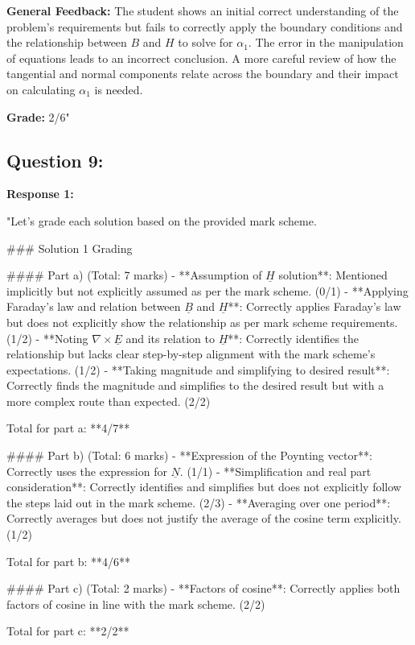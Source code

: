 \documentclass[a4paper,11pt]{article}
\begin{document}
\textbf{General Feedback:}
The student shows an initial correct understanding of the problem's requirements but fails to correctly apply the boundary conditions and the relationship between \(B\) and \(H\) to solve for \(\alpha_1\). The error in the manipulation of equations leads to an incorrect conclusion. A more careful review of how the tangential and normal components relate across the boundary and their impact on calculating \(\alpha_1\) is needed.

\textbf{Grade:} 2/6"

\subsection*{Question 9:}

\textbf{Response 1:}

"Let's grade each solution based on the provided mark scheme.

### Solution 1 Grading

#### Part a) (Total: 7 marks)
- **Assumption of \(\underline{H}\) solution**: Mentioned implicitly but not explicitly assumed as per the mark scheme. (0/1)
- **Applying Faraday's law and relation between \(\underline{B}\) and \(\underline{H}\)**: Correctly applies Faraday's law but does not explicitly show the relationship as per mark scheme requirements. (1/2)
- **Noting \(\nabla \times \underline{E}\) and its relation to \(\underline{H}\)**: Correctly identifies the relationship but lacks clear step-by-step alignment with the mark scheme's expectations. (1/2)
- **Taking magnitude and simplifying to desired result**: Correctly finds the magnitude and simplifies to the desired result but with a more complex route than expected. (2/2)

Total for part a: **4/7**

#### Part b) (Total: 6 marks)
- **Expression of the Poynting vector**: Correctly uses the expression for \(\underline{N}\). (1/1)
- **Simplification and real part consideration**: Correctly identifies and simplifies but does not explicitly follow the steps laid out in the mark scheme. (2/3)
- **Averaging over one period**: Correctly averages but does not justify the average of the cosine term explicitly. (1/2)

Total for part b: **4/6**

#### Part c) (Total: 2 marks)
- **Factors of cosine**: Correctly applies both factors of cosine in line with the mark scheme. (2/2)

Total for part c: **2/2**
\end{document}
